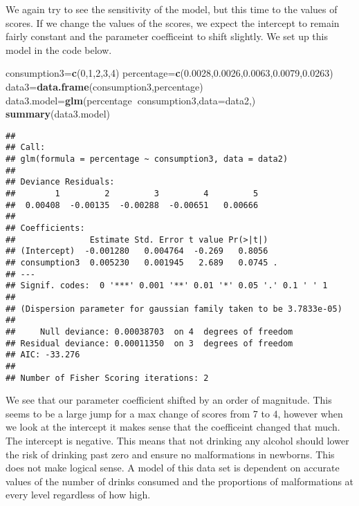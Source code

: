 \documentclass[
]{article}
\newenvironment{Shaded}{\begin{snugshade}}{\end{snugshade}}
\newcommand{\DataTypeTok}[1]{\textcolor[rgb]{0.13,0.29,0.53}{#1}}
\newcommand{\DecValTok}[1]{\textcolor[rgb]{0.00,0.00,0.81}{#1}}
\newcommand{\FloatTok}[1]{\textcolor[rgb]{0.00,0.00,0.81}{#1}}
\newcommand{\KeywordTok}[1]{\textcolor[rgb]{0.13,0.29,0.53}{\textbf{#1}}}
\newcommand{\NormalTok}[1]{#1}
\newcommand{\OperatorTok}[1]{\textcolor[rgb]{0.81,0.36,0.00}{\textbf{#1}}}
\begin{document}
We again try to see the sensitivity of the model, but this time to the
values of scores. If we change the values of the scores, we expect the
intercept to remain fairly constant and the parameter coefficeint to
shift slightly. We set up this model in the code below.

\begin{Shaded}
\begin{Highlighting}[]
\NormalTok{consumption3=}\KeywordTok{c}\NormalTok{(}\DecValTok{0}\NormalTok{,}\DecValTok{1}\NormalTok{,}\DecValTok{2}\NormalTok{,}\DecValTok{3}\NormalTok{,}\DecValTok{4}\NormalTok{)}
\NormalTok{percentage=}\KeywordTok{c}\NormalTok{(}\FloatTok{0.0028}\NormalTok{,}\FloatTok{0.0026}\NormalTok{,}\FloatTok{0.0063}\NormalTok{,}\FloatTok{0.0079}\NormalTok{,}\FloatTok{0.0263}\NormalTok{)}
\NormalTok{data3=}\KeywordTok{data.frame}\NormalTok{(consumption3,percentage)}
\NormalTok{data3.model=}\KeywordTok{glm}\NormalTok{(percentage}\OperatorTok{~}\NormalTok{consumption3,}\DataTypeTok{data=}\NormalTok{data2,)}
\KeywordTok{summary}\NormalTok{(data3.model)}
\end{Highlighting}
\end{Shaded}

\begin{verbatim}
## 
## Call:
## glm(formula = percentage ~ consumption3, data = data2)
## 
## Deviance Residuals: 
##        1         2         3         4         5  
##  0.00408  -0.00135  -0.00288  -0.00651   0.00666  
## 
## Coefficients:
##               Estimate Std. Error t value Pr(>|t|)  
## (Intercept)  -0.001280   0.004764  -0.269   0.8056  
## consumption3  0.005230   0.001945   2.689   0.0745 .
## ---
## Signif. codes:  0 '***' 0.001 '**' 0.01 '*' 0.05 '.' 0.1 ' ' 1
## 
## (Dispersion parameter for gaussian family taken to be 3.7833e-05)
## 
##     Null deviance: 0.00038703  on 4  degrees of freedom
## Residual deviance: 0.00011350  on 3  degrees of freedom
## AIC: -33.276
## 
## Number of Fisher Scoring iterations: 2
\end{verbatim}

We see that our parameter coefficient shifted by an order of magnitude.
This seems to be a large jump for a max change of scores from 7 to 4,
however when we look at the intercept it makes sense that the
coefficeint changed that much. The intercept is negative. This means
that not drinking any alcohol should lower the risk of drinking past
zero and ensure no malformations in newborns. This does not make logical
sense. A model of this data set is dependent on accurate values of the
number of drinks consumed and the proportions of malformations at every
level regardless of how high.
\end{document}

